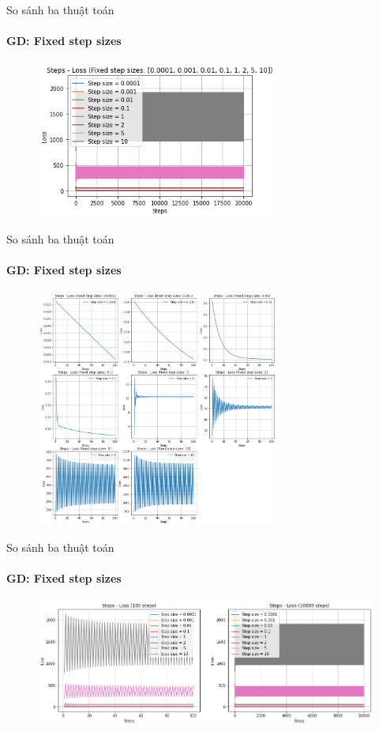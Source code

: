 \documentclass[10pt]{beamer}
\theoremstyle{remark}
\theoremstyle{definition}
\begin{document}
\begin{frame}{So sánh ba thuật toán}
	\framesubtitle{GD: Fixed step sizes}
	\begin{figure}
		\centering
		\includegraphics[width=8cm]{Thinh/1.png}
	  \end{figure}

\end{frame}
\begin{frame}{So sánh ba thuật toán}
	\framesubtitle{GD: Fixed step sizes}

	  \begin{figure}
		\centering
		\includegraphics[width=8cm]{Thinh/2.png}
	  \end{figure}

\end{frame}
\begin{frame}{So sánh ba thuật toán}
	\framesubtitle{GD: Fixed step sizes}

	  \begin{figure}
		\centering
		\includegraphics[width=12cm]{Thinh/3.png}
	  \end{figure}

\end{frame}
\end{document}
